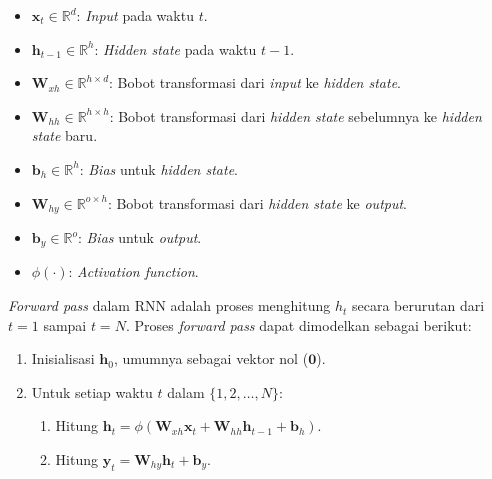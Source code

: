 \begin{itemize}
    \item $\mathbf{x}_t \in \mathbb{R}^d$: \textit{Input} pada waktu $t$.
    \item $\mathbf{h}_{t-1} \in \mathbb{R}^h$: \textit{Hidden state} pada waktu $t-1$.
    \item $\mathbf{W}_{xh} \in \mathbb{R}^{h \times d}$: Bobot transformasi dari \textit{input} ke \textit{hidden state}.
\item $\mathbf{W}_{hh} \in \mathbb{R}^{h \times h}$: Bobot transformasi dari \textit{hidden state} sebelumnya ke \textit{hidden state} baru.
    \item $\mathbf{b}_h \in \mathbb{R}^h$: \textit{Bias} untuk \textit{hidden state}.
    \item $\mathbf{W}_{hy} \in \mathbb{R}^{o \times h}$: Bobot transformasi dari \textit{hidden state} ke \textit{output}.
    \item $\mathbf{b}_y \in \mathbb{R}^o$: \textit{Bias} untuk \textit{output}.
    \item $\phi(\cdot)$: \textit{Activation function}.
\end{itemize}

\textit{Forward pass} dalam RNN adalah proses menghitung $h_t$ secara berurutan dari $t=1$ sampai $t=N$. Proses \textit{forward pass} dapat dimodelkan sebagai berikut: 
\begin{enumerate}
    \item Inisialisasi $\mathbf{h}_0$, umumnya sebagai vektor nol ($\mathbf{0}$).
    \item Untuk setiap waktu $t$ dalam $\{1, 2, \dots, N\}$:
 \begin{enumerate}
        \item Hitung $\mathbf{h}_t = \phi(\mathbf{W}_{xh}\mathbf{x}_t + \mathbf{W}_{hh}\mathbf{h}_{t-1} + \mathbf{b}_h)$.
        \item Hitung $\mathbf{y}_t = \mathbf{W}_{hy}\mathbf{h}_t + \mathbf{b}_y$.
  \end{enumerate}
\end{enumerate}

